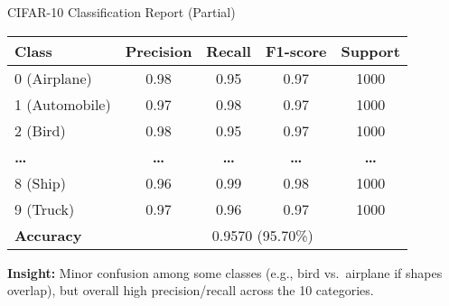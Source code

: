 \documentclass{beamer}
\begin{document}
\begin{frame}{CIFAR-10 Classification Report (Partial)}
    \small
    \centering
    \begin{tabular}{lcccc}
        \toprule
        \textbf{Class}    & \textbf{Precision} & \textbf{Recall} & \textbf{F1-score} & \textbf{Support} \\
        \midrule
        0 (Airplane)      & 0.98               & 0.95            & 0.97              & 1000             \\
        1 (Automobile)    & 0.97               & 0.98            & 0.97              & 1000             \\
        2 (Bird)          & 0.98               & 0.95            & 0.97              & 1000             \\
        \textbf{\ldots}      & \textbf{\ldots}       & \textbf{\ldots}    & \textbf{\ldots}      & \textbf{\ldots}     \\
        8 (Ship)          & 0.96               & 0.99            & 0.98              & 1000             \\
        9 (Truck)         & 0.97               & 0.96            & 0.97              & 1000             \\
        \midrule
        \textbf{Accuracy} & \multicolumn{4}{c}{0.9570 (95.70\%)} \\
        \bottomrule
    \end{tabular}
    
    \vspace{1em}
    \textbf{Insight:} Minor confusion among some classes (e.g., bird vs.\ airplane if shapes overlap), but overall high precision/recall across the 10 categories.
\end{frame}
\end{document}
